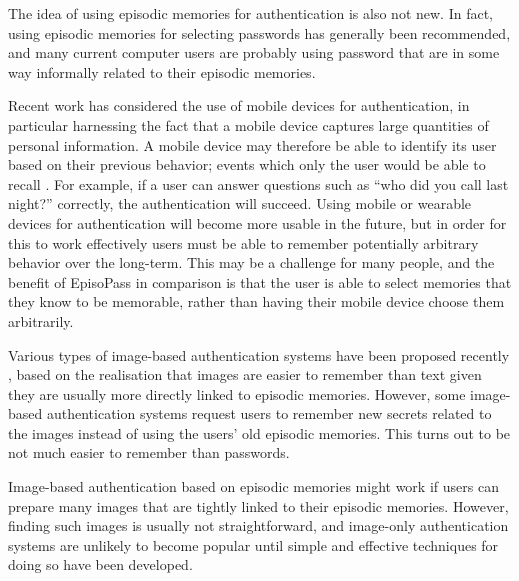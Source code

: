\documentclass[runningheads,a4paper]{llncs}
\begin{document}

The idea of using episodic memories for authentication is also not new.
In fact, using episodic memories for selecting passwords
has generally been recommended,
and many current computer users are probably using password that are
in some way informally related to their episodic memories.

Recent work has considered the use of mobile devices for authentication,
in particular harnessing the fact that a mobile device captures large quantities
of personal information. A mobile device may therefore be able to identify
its user based on their previous behavior; events which only the user would be able to recall \cite{Dandapat:2015:AYD:2702123.2702457,Das:2013:ECE:2493432.2493453,GuptaWRLGB12}%
.
For example, if a user can answer questions such as
``who did you call last night?'' correctly, the authentication will succeed.
Using mobile or wearable devices for authentication will become more usable
in the future,
but in order for this to work effectively users must be able to remember potentially
arbitrary behavior over the long-term. This may be a challenge for many people, and the 
benefit of EpisoPass in comparison is that the user is able to select memories that they
know to be memorable, rather than having their mobile device choose them arbitrarily.

Various types of image-based authentication systems have been proposed recently%
\cite{Biddle:2012:GPL:2333112.2333114,GraphicalPasswords},
based on the realisation that images are easier to remember than text
given they are usually more directly linked to episodic memories.
However, some image-based authentication systems request
users to remember new secrets related to the images instead of
using the users' old episodic memories.
This turns out to be not much easier to remember than passwords.
%

Image-based authentication based on episodic memories might work
if users can prepare many images 
that are tightly linked to their episodic memories.
However, finding such images is usually not straightforward, and
image-only authentication systems are unlikely to become popular
until simple and effective techniques for doing so have been developed.
\end{document}
